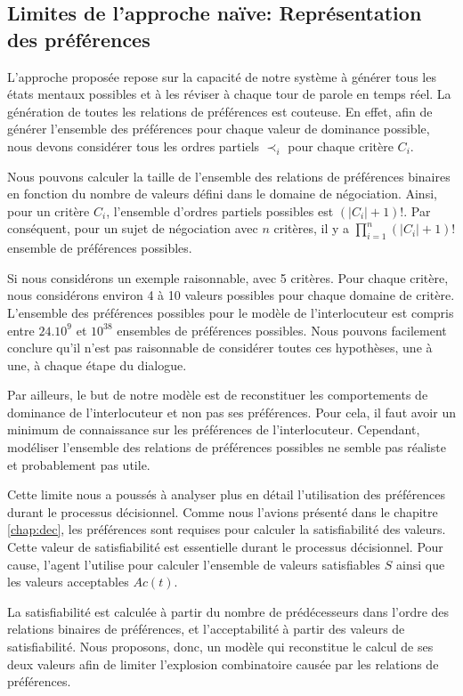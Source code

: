 \subsection{Limites de l'approche naïve: Représentation des préférences}

L'approche proposée repose sur la capacité de notre système à générer tous les états mentaux possibles et à les réviser à chaque tour de parole en temps réel. La génération de toutes les relations de préférences est couteuse. En effet, afin de générer l'ensemble des préférences pour chaque valeur de dominance possible, nous devons considérer tous les ordres partiels $\prec_i$ pour chaque critère $C_i$. 

Nous pouvons calculer la taille de l'ensemble des relations de préférences binaires en fonction du nombre de valeurs défini dans le domaine de négociation. Ainsi, pour un critère $C_i$, l'ensemble d'ordres partiels possibles est  $(|C_i|+1)! $. Par conséquent, pour un sujet de négociation avec $n$ critères, il y a $\prod_{i=1}^n (|C_i|+1)!$ ensemble de préférences possibles.

Si nous considérons un exemple raisonnable, avec 5 critères. Pour chaque critère, nous considérons environ 4 à 10 valeurs possibles pour chaque domaine de critère. L'ensemble des préférences possibles pour le modèle de l'interlocuteur est compris entre $ 24.10 ^ 9 $ et $ 10 ^ {38} $ ensembles de préférences possibles.
Nous pouvons facilement conclure qu'il n'est pas raisonnable de considérer toutes ces hypothèses, une à une, à chaque étape du dialogue.

Par ailleurs, le but de notre modèle est de reconstituer les comportements de dominance de l'interlocuteur et non pas ses préférences. Pour cela, il faut avoir un minimum de connaissance sur les préférences de l'interlocuteur. Cependant, modéliser l'ensemble des relations de préférences possibles ne semble pas réaliste et probablement pas utile.

Cette limite nous a poussés à analyser plus en détail l'utilisation des préférences durant le processus décisionnel. Comme nous l'avions présenté dans le chapitre \ref{chap:dec}, les préférences sont requises pour calculer la satisfiabilité des valeurs. Cette valeur de satisfiabilité est essentielle durant le processus décisionnel. Pour cause, l'agent l'utilise pour calculer l'ensemble de valeurs satisfiables $S$ ainsi que les valeurs acceptables $Ac(t)$.

La satisfiabilité est calculée à partir du nombre de prédécesseurs dans l'ordre des relations binaires de préférences, et l'acceptabilité à partir des valeurs de satisfiabilité. Nous proposons, donc, un modèle qui reconstitue le calcul de ses deux valeurs afin de limiter l'explosion combinatoire causée par les relations de préférences. 

